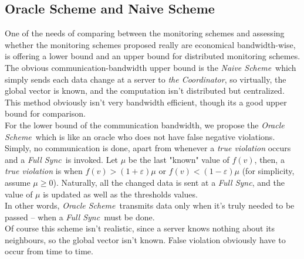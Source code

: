 \documentclass[10pt, conference]{IEEEtran}
\newcommand{\fullSync}{\textit{Full Sync}}
\newcommand{\naiveScheme}{\textit{Naive Scheme}}
\newcommand{\oracleScheme}{\textit{Oracle Scheme}}
\newcommand{\theCoordinator}{\textit{the Coordinator}}
\begin{document}
\subsection{Oracle Scheme and Naive Scheme}
One of the needs of comparing between the monitoring schemes and assessing whether the monitoring schemes proposed really are economical bandwidth-wise, is offering a lower bound and an upper bound for distributed monitoring schemes. \\
The obvious communication-bandwidth upper bound is the \naiveScheme \ which simply sends each data change at a server to \theCoordinator , so virtually, the global vector is known, and the computation isn't distributed but centralized. This method obviously isn't very bandwidth efficient, though its a good upper bound for comparison. \\
For the lower bound of the communication bandwidth, we propose the \oracleScheme \ which is like an oracle who does not have false negative violations. Simply, no communication is done, apart from whenever a \textit{true violation} occurs and a \fullSync \ is invoked. Let $\mu$ be the last "known" value of $f(v)$, then, a \textit{true violation} is when ${f(v) > (1
+\varepsilon)\mu}$ or ${f(v) < (1-\varepsilon)\mu}$ (for simplicity, assume ${\mu \geq 0}$). Naturally, all the changed data  is sent at a \fullSync , and the value of $\mu$ is updated as well as the thresholds values. \\
In other words, \oracleScheme \ transmits data only when it's truly needed to be passed -- when a \fullSync \ must be done. \\
Of course this scheme isn't realistic, since a server knows nothing about its neighbours, so the global vector isn't known. False violation obviously have to occur from time to time. 
\end{document}
